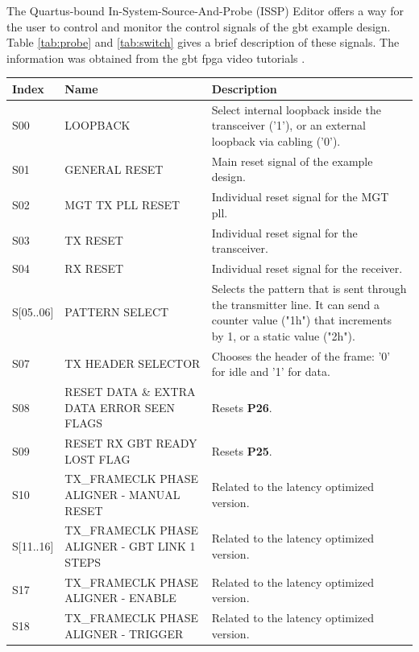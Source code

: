 \documentclass[main.tex]{subfiles}
\begin{document}
The Quartus-bound In-System-Source-And-Probe (ISSP) Editor offers a way for the user to control and monitor the control signals of the \gls{gbt} example design. Table \ref{tab:probe} and \ref{tab:switch} gives a brief description of these signals. The information was obtained from the \gls{gbt} \gls{fpga} video tutorials \cite{gbt_videos}.
\begin{table}[H]
\small
\begin{center}
  \begin{tabular}{| l | p{5cm} | p{8cm} |}
  \hline
    Index & Name & Description   \\
    \hline
  S00     & LOOPBACK                        & Select internal loopback inside the transceiver ('1'), or an external loopback via cabling ('0'). \\ \hline
  S01     & GENERAL RESET                     & Main reset signal of the example design. \\ \hline
  S02     & MGT TX PLL RESET                    & Individual reset signal for the MGT pll. \\ \hline
  S03     & TX RESET                        & Individual reset signal for the transceiver. \\ \hline
  S04     & RX RESET                        & Individual reset signal for the receiver. \\ \hline
  S[05..06]   & PATTERN SELECT                    & Selects the pattern that is sent through the transmitter line.
  It can send a counter value ("1h") that increments by 1, or a static value ("2h"). \\ \hline
  S07     & TX HEADER SELECTOR                  & Chooses the header of the frame: '0' for idle and '1' for data. \\ \hline
  S08     & RESET DATA \& EXTRA DATA ERROR SEEN FLAGS       & Resets \textbf{P26}.\\ \hline
  S09     & RESET RX GBT READY LOST FLAG              & Resets \textbf{P25}.\\ \hline
  S10     & TX\_FRAMECLK PHASE ALIGNER - MANUAL RESET         & Related to the latency optimized version.\\ \hline
  S[11..16] & TX\_FRAMECLK PHASE ALIGNER - GBT LINK 1 STEPS       & Related to the latency optimized version.\\ \hline
  S17     & TX\_FRAMECLK PHASE ALIGNER - ENABLE           & Related to the latency optimized version.\\ \hline
  S18     & TX\_FRAMECLK PHASE ALIGNER - TRIGGER          & Related to the latency optimized version.\\ \hline

\end{tabular}
\end{center}
\end{table}
\end{document}
